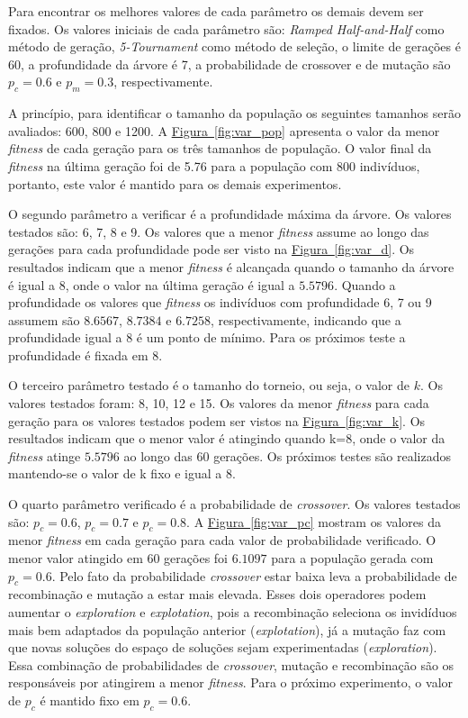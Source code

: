 \documentclass[a4paper]{paper}
\begin{document}
Para encontrar os melhores valores de cada parâmetro os demais devem ser fixados.
Os valores iniciais de cada parâmetro são: \textit{Ramped Half-and-Half} como
método de geração, \textit{5-Tournament} como método de seleção, o limite de
gerações é 60, a profundidade da árvore é 7, a probabilidade de crossover e de
mutação são $p_c=0.6$ e $p_m=0.3$, respectivamente.

A princípio, para identificar o tamanho da população os seguintes tamanhos serão
avaliados: 600, 800 e 1200. A \hyperref[fig:var_pop]{Figura~\ref*{fig:var_pop}}
apresenta o valor da menor \textit{fitness} de cada geração para os três tamanhos
de população. O valor final da \textit{fitness} na última geração foi de 5.76
para a população com 800 indivíduos, portanto, este valor é mantido para os
demais experimentos.


O segundo parâmetro a verificar é a profundidade máxima da árvore. Os valores
testados são: 6, 7, 8 e 9. Os valores que a menor \textit{fitness} assume ao
longo das gerações para cada profundidade pode ser visto na
\hyperref[fig:var_d]{Figura~\ref*{fig:var_d}}. Os resultados indicam que a menor
\textit{fitness} é alcançada quando o tamanho da árvore é igual a 8, onde o
valor na última geração é igual a $5.5796$. Quando a profundidade os valores que
\textit{fitness} os indivíduos com profundidade 6, 7 ou 9 assumem são $8.6567$,
$8.7384$ e $6.7258$, respectivamente, indicando que a profundidade igual a 8 é
um ponto de mínimo. Para os próximos teste a profundidade é fixada em 8.


O terceiro parâmetro testado é o tamanho do torneio, ou seja, o valor de $k$.
Os valores testados foram: 8, 10, 12 e 15. Os valores da menor \textit{fitness}
para cada geração para os valores testados podem ser vistos na
\hyperref[fig:var_k]{Figura~\ref*{fig:var_k}}.  Os resultados indicam que o
menor valor é atingindo quando k=8, onde o valor da \textit{fitness} atinge
$5.5796$ ao longo das 60 gerações. Os próximos testes são realizados mantendo-se
o valor de k fixo e igual a 8.

O quarto parâmetro verificado é a probabilidade de \textit{crossover}. Os
valores testados são: $p_c=0.6$, $p_c=0.7$ e $p_c=0.8$. A
\hyperref[fig:var_pc]{Figura~\ref*{fig:var_pc}} mostram os valores da menor
\textit{fitness} em cada geração para cada valor de probabilidade verificado.  O
menor valor atingido em 60 gerações foi $6.1097$ para a população gerada com
$p_c=0.6$. Pelo fato da probabilidade \textit{crossover} estar baixa leva a
probabilidade de recombinação e mutação a estar mais elevada. Esses dois
operadores podem aumentar o \textit{exploration} e \textit{explotation}, pois a
recombinação seleciona os invidíduos mais bem adaptados da população anterior
(\textit{explotation}), já a mutação faz com que novas soluções do espaço de
soluções sejam experimentadas (\textit{exploration}). Essa combinação de
probabilidades de \textit{crossover}, mutação e recombinação são os responsáveis
por atingirem a menor \textit{fitness}. Para o próximo experimento, o valor de
$p_c$ é mantido fixo em $p_c=0.6$.
\end{document}
